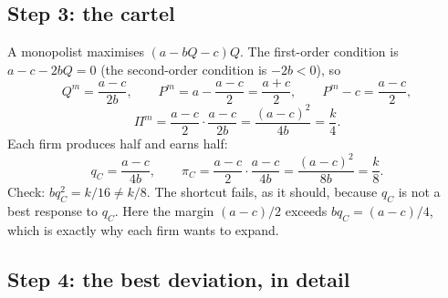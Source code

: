 \documentclass[11pt,a4paper]{article}
\begin{document}
\subsection*{Step 3: the cartel}

A monopolist maximises $(a - bQ - c)Q$. The first-order condition is $a - c - 2bQ = 0$ (the
second-order condition is $-2b < 0$), so
\[
Q^m = \frac{a-c}{2b}, \qquad P^m = a - \frac{a-c}{2} = \frac{a+c}{2}, \qquad P^m - c = \frac{a-c}{2},
\]
\[
\Pi^m = \frac{a-c}{2}\cdot\frac{a-c}{2b} = \frac{(a-c)^2}{4b} = \frac{k}{4}.
\]
Each firm produces half and earns half:
\[
q_C = \frac{a-c}{4b}, \qquad \pi_C = \frac{a-c}{2}\cdot\frac{a-c}{4b} = \frac{(a-c)^2}{8b} = \frac{k}{8}.
\]
Check: $b q_C^2 = k/16 \neq k/8$. The shortcut fails, as it should, because $q_C$ is not a best
response to $q_C$. Here the margin $(a-c)/2$ exceeds $b q_C = (a-c)/4$, which is exactly why each firm
wants to expand.

\subsection*{Step 4: the best deviation, in detail}
\end{document}
